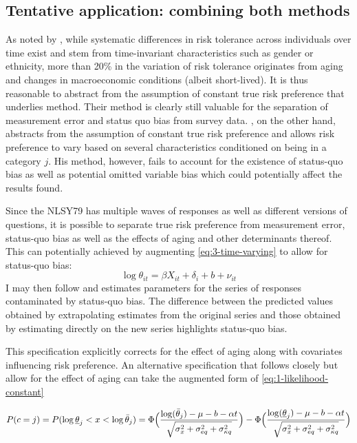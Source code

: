 \documentclass[]{article}
\begin{document}
	
\subsection{Tentative application: combining both methods}	
As noted by \citet{sahm2012much}, while systematic differences in risk tolerance across individuals over time exist and stem from time-invariant characteristics such as gender or ethnicity, more than 20\% in the variation of risk tolerance originates from aging and changes in macroeconomic conditions (albeit short-lived). It is thus reasonable to abstract from the assumption of constant true risk preference that underlies \citet{kimball2008imputing, kimball2009risk} method. Their method is clearly still valuable for the separation of measurement error and status quo bias from survey data. \citet{ahn2010attitudes}, on the other hand, abstracts from the assumption of constant true risk preference and allows risk preference to vary based on several characteristics conditioned on being in a category $j$. His method, however, fails to account for the existence of status-quo bias as well as potential omitted variable bias which could potentially affect the results found. 

Since the NLSY79 has multiple waves of responses as well as different versions of questions, it is possible to separate true risk preference from measurement error, status-quo bias as well as the effects of aging and other determinants thereof. This can potentially achieved by augmenting \eqref{eq:3-time-varying} to allow for status-quo bias:
\begin{equation}
	\log \theta_{it}=\beta X_{it} + \delta_i+ b +\nu_{it}
	\label{eq:5-ahn-bias}
\end{equation} 
I may then follow \citet{ahn2010attitudes} and estimates parameters for the series of responses contaminated by status-quo bias. The difference between the predicted values obtained by extrapolating estimates from the original series and those obtained by estimating directly on the new series highlights status-quo bias. 

This specification explicitly corrects for the effect of aging along with covariates influencing risk preference. An alternative specification that follows \citet{kimball2008imputing} closely but allow for the effect of aging can take the augmented form of \eqref{eq:1-likelihood-constant}

\begin{equation}
	P(c=j)=P(\log\underline{\theta}_j<x<\log\bar{\theta}_j)=\Phi\Big({\log(\bar{\theta}_j)-\mu-b-\alpha t\over\sqrt{\sigma_x^2+\sigma_{eq}^2+\sigma_{\kappa q}^2}}\Big)-\Phi\Big({\log(\underline{\theta}_j)-\mu-b-\alpha t\over\sqrt{\sigma_x^2+\sigma_{eq}^2+\sigma_{\kappa q}^2}}\Big)
	\label{eq:6-kimball-age}
\end{equation} 	
\end{document}
